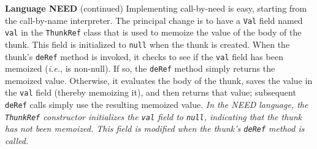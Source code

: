 \begin{minipage}[t]{\sw}
\slidenumber
\LARGE
{\bf Language NEED} (continued)\exx
Implementing call-by-need is easy, starting
from the call-by-name interpreter.
The principal change is to have a \verb'Val' field named \verb'val'
in the \verb'ThunkRef' class
that is used to memoize the value of the body of the thunk.
This field is initialized to \verb'null' when the thunk is created.
When the thunk's \verb'deRef' method is invoked,
it checks to see if the \verb'val' field has been memoized
({\em i.e.}, is non-null).
If so, the \verb'deRef' method simply returns the memoized value.
Otherwise, it evaluates the body of the thunk,
saves the value in the \verb'val' field (thereby memoizing it),
and then returns that value;
subsequent \verb'deRef' calls simply use the resulting memoized value.\exx
{\em In the NEED language,
the \verb'ThunkRef' constructor initializes
the \verb'val' field to \verb'null',
indicating that the thunk has not been memoized.
This field is modified when the thunk's \verb'deRef' method is called.}
\end{minipage}
